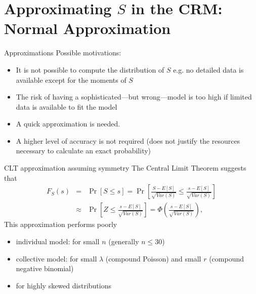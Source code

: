 \documentclass[11pt]{beamer}
\begin{document}
\section{Approximating $S$ in the CRM: Normal Approximation}
\begin{frame}{Approximations}
Possible motivations:
\vfill
\begin{itemize}
\item It is not possible to compute the distribution of $S$ e.g. no detailed data is available except for the moments of $S$

\vfill
\item The risk of having a sophisticated---but wrong---model is too high if limited data is available to fit the model
\vfill
\item A quick approximation is needed.
\vfill
\item A higher level of accuracy is not required (does not justify the resources necessary to calculate an exact probability)
\end{itemize}
\end{frame}
\begin{frame}{CLT approximation assuming symmetry}
The Central Limit Theorem suggests that
\begin{eqnarray*}
F_{S}\left( s\right)  &=&\Pr\left[ S\leq s\right] =\Pr\left[ \frac{S-E[S] }{\sqrt{Var(S)} }\leq \frac{s-E[S] }{\sqrt{Var(S)} }\right]  \\
&\approx &\Pr\left[ Z\leq \frac{s-E[S] }{\sqrt{Var(S)} }\right]=\Phi \left( \frac{s-E[S] }{\sqrt{Var(S)} }\right) ,
\end{eqnarray*}
\vfill
This approximation performs poorly
\begin{itemize}
\item individual model: for small $n$ (generally $n\leq 30$)
\item collective model: for small $\lambda$ (compound Poisson) and small $r$ (compound negative binomial)
\item for \alert{highly skewed} distributions
\end{itemize}

\end{frame}
\end{document}
